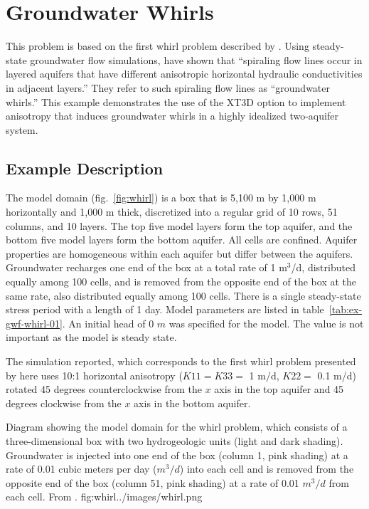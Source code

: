 \section{Groundwater Whirls}

This problem is based on the first whirl problem described by \cite{modflow6xt3d}.  Using steady-state groundwater flow simulations, \citet{hemker2004ground} have shown that ``spiraling flow lines occur in layered aquifers that have different anisotropic horizontal hydraulic conductivities in adjacent layers.'' They refer to such spiraling flow lines as ``groundwater whirls.'' This example demonstrates the use of the XT3D option to implement anisotropy that induces groundwater whirls in a highly idealized two-aquifer system. 

\subsection{Example Description}

The model domain (fig.~\ref{fig:whirl}) is a box that is 5,100 m by 1,000 m horizontally and 1,000 m thick, discretized into a regular grid of 10 rows, 51 columns, and 10 layers. The top five model layers form the top aquifer, and the bottom five model layers form the bottom aquifer. All cells are confined. Aquifer properties are homogeneous within each aquifer but differ between the aquifers. Groundwater recharges one end of the box at a total rate of 1 m$^{3}$/d, distributed equally among 100 cells, and is removed from the opposite end of the box at the same rate, also distributed equally among 100 cells.  There is a single steady-state stress period with a length of 1 day.   Model parameters are listed in table~\ref{tab:ex-gwf-whirl-01}. An initial head of 0 $m$ was specified for the model.  The value is not important as the model is steady state.

The simulation reported, which corresponds to the first whirl problem presented by \cite{modflow6xt3d} here uses 10:1 horizontal anisotropy ($K11 = K33 =$ 1 m/d, $K22 =$ 0.1 m/d) rotated 45 degrees counterclockwise from the $x$ axis in the top aquifer and 45 degrees clockwise from the $x$ axis in the bottom aquifer.

\begin{StandardFigure}{
                                     Diagram showing the model domain for the whirl problem, which consists of a three-dimensional box with two hydrogeologic units (light and dark shading). Groundwater is injected into one end of the box (column 1, pink shading) at a rate of 0.01 cubic meters per day ($m^3/d$) into each cell and is removed from the opposite end of the box (column 51, pink shading) at a rate of 0.01 $m^3/d$ from each cell.  From \cite{modflow6xt3d}.
                                     }{fig:whirl}{../images/whirl.png}
\end{StandardFigure}                                 


